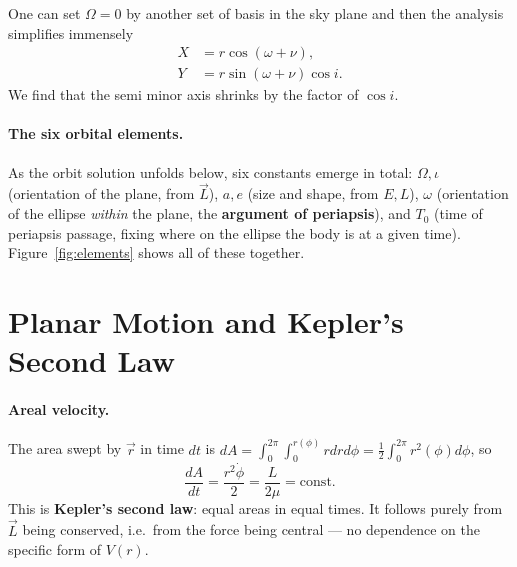 \documentclass[11pt]{article}
\newcommand{\vecr}{\vec r}
\newcommand{\vecL}{\vec L}
\begin{document}
One can set $\Omega=0$ by another set of basis in the sky plane and then the analysis simplifies immensely
\begin{align}
X &= r\cos(\omega+\nu),\\
Y &= r\sin (\omega+\nu)\cos i.
\end{align}
We find that the semi minor axis shrinks by the factor of $\cos i$.
\paragraph{The six orbital elements.} As the orbit solution unfolds below, six constants emerge in total: $\Omega,\iota$ (orientation of the plane, from $\vecL$), $a,e$ (size and shape, from $E,L$), $\omega$ (orientation of the ellipse \emph{within} the plane, the \textbf{argument of periapsis}), and $T_0$ (time of periapsis passage, fixing where on the ellipse the body is at a given time). Figure~\ref{fig:elements} shows all of these together.

\section{Planar Motion and Kepler's Second Law}

\paragraph{Areal velocity.} The area swept by $\vecr$ in time $dt$ is $dA=\int_{0}^{2\pi}\int_{0}^{r(\phi)} r drd\phi=\frac{1}{2}\int_{0}^{2\pi}r^2(\phi)d\phi$, so
\begin{equation}
\frac{dA}{dt}=\frac{r^2\dot\phi}{2} = \frac{L}{2\mu} = \text{const.} \label{eq:kepler2}
\end{equation}
This is \textbf{Kepler's second law}: equal areas in equal times. It follows purely from $\vecL$ being conserved, i.e.\ from the force being central — no dependence on the specific form of $V(r)$.
\end{document}
